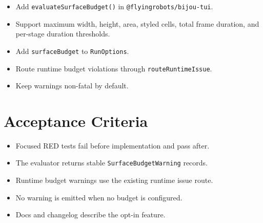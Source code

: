 \begin{itemize}
\tightlist
\item
  Add \texttt{e\allowbreak{}v\allowbreak{}a\allowbreak{}l\allowbreak{}u\allowbreak{}a\allowbreak{}t\allowbreak{}e\allowbreak{}S\allowbreak{}u\allowbreak{}r\allowbreak{}f\allowbreak{}a\allowbreak{}c\allowbreak{}e\allowbreak{}B\allowbreak{}u\allowbreak{}d\allowbreak{}g\allowbreak{}e\allowbreak{}t\allowbreak{}(\allowbreak{})} in \texttt{@\allowbreak{}f\allowbreak{}l\allowbreak{}y\allowbreak{}i\allowbreak{}n\allowbreak{}g\allowbreak{}r\allowbreak{}o\allowbreak{}b\allowbreak{}o\allowbreak{}t\allowbreak{}s\allowbreak{}/\allowbreak{}b\allowbreak{}i\allowbreak{}j\allowbreak{}o\allowbreak{}u\allowbreak{}-\allowbreak{}t\allowbreak{}u\allowbreak{}i}.
\item
  Support maximum width, height, area, styled cells, total frame duration, and per-stage duration thresholds.
\item
  Add \texttt{s\allowbreak{}u\allowbreak{}r\allowbreak{}f\allowbreak{}a\allowbreak{}c\allowbreak{}e\allowbreak{}B\allowbreak{}u\allowbreak{}d\allowbreak{}g\allowbreak{}e\allowbreak{}t} to \texttt{R\allowbreak{}u\allowbreak{}n\allowbreak{}O\allowbreak{}p\allowbreak{}t\allowbreak{}i\allowbreak{}o\allowbreak{}n\allowbreak{}s}.
\item
  Route runtime budget violations through \texttt{r\allowbreak{}o\allowbreak{}u\allowbreak{}t\allowbreak{}e\allowbreak{}R\allowbreak{}u\allowbreak{}n\allowbreak{}t\allowbreak{}i\allowbreak{}m\allowbreak{}e\allowbreak{}I\allowbreak{}s\allowbreak{}s\allowbreak{}u\allowbreak{}e}.
\item
  Keep warnings non-fatal by default.
\end{itemize}

\section{Acceptance Criteria}\label{record-157-acceptance-criteria}

\begin{itemize}
\tightlist
\item
  Focused RED tests fail before implementation and pass after.
\item
  The evaluator returns stable \texttt{S\allowbreak{}u\allowbreak{}r\allowbreak{}f\allowbreak{}a\allowbreak{}c\allowbreak{}e\allowbreak{}B\allowbreak{}u\allowbreak{}d\allowbreak{}g\allowbreak{}e\allowbreak{}t\allowbreak{}W\allowbreak{}a\allowbreak{}r\allowbreak{}n\allowbreak{}i\allowbreak{}n\allowbreak{}g} records.
\item
  Runtime budget warnings use the existing runtime issue route.
\item
  No warning is emitted when no budget is configured.
\item
  Docs and changelog describe the opt-in feature.
\end{itemize}

